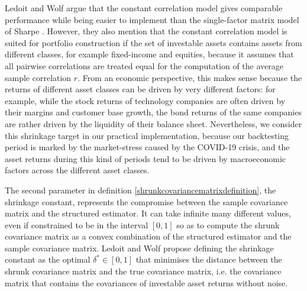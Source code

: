    	Ledoit and Wolf argue that the constant correlation model gives comparable performance while being easier to implement than the single-factor matrix model of Sharpe \cite{ledoit}. However, they also mention that the constant correlation model is suited for portfolio construction if the set of investable assets contains assets from different classes, for example fixed-income and equities, because it assumes that all pairwise correlations are treated equal for the computation of the average sample correlation $r$. From an economic perspective, this makes sense because the returns of different asset classes can be driven by very different factors: for example, while the stock returns of technology companies are often driven by their margins and customer base growth, the bond returns of the same companies are rather driven by the liquidity of their balance sheet. Nevertheless, we consider this shrinkage target in our practical implementation, because our backtesting period is marked by the market-stress caused by the COVID-19 crisis, and the asset returns during this kind of periods tend to be driven by macroeconomic factors across the different asset classes.
    	
    	The second parameter in definition \ref{shrunkcovariancematrixdefinition}, the shrinkage constant, represents the compromise between the sample covariance matrix and the structured estimator. It can take infinite many different values, even if constrained to be in the interval $[0,1]$ so as to compute the shrunk covariance matrix as a convex combination of the structured estimator and the sample covariance matrix. Ledoit and Wolf propose defining the shrinkage constant as the optimal $\delta^* \in [0,1]$ that minimises the distance between the shrunk covariance matrix and the true covariance matrix, i.e. the covariance matrix that contains the covariances of investable asset returns without noise.
    	
